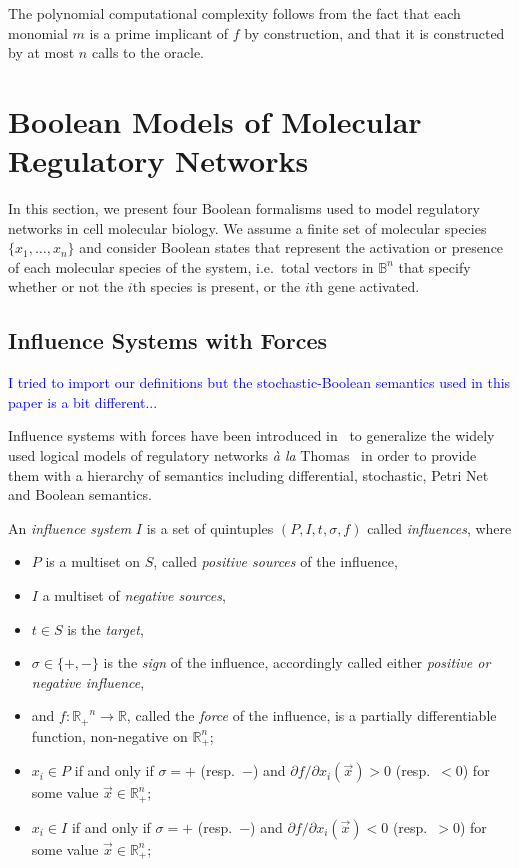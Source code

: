 \documentclass{llncs}
\newcommand{\francois}[1]{\textcolor{blue}{#1}}
\begin{document}
The polynomial computational complexity follows from the fact that each monomial $m$ is a prime implicant
of $f$ by construction, and that it is constructed by at most $n$ calls to the
oracle.




\section{Boolean Models of Molecular Regulatory Networks}

In this section, we present four Boolean formalisms used to model regulatory networks in cell molecular biology.
We assume a finite set of molecular species $\{x_1,\dots,x_n\}$ 
and consider Boolean states that represent the activation or presence of each molecular species of the system, 
i.e.~total vectors in $\mathbb{B}^n$ that specify whether or not the $i$th species is present, or the $i$th gene activated.

\subsection{Influence Systems with Forces}

\francois{I tried to import our definitions but the stochastic-Boolean semantics used in this paper is a bit different...}

Influence systems with forces have been introduced in~\cite{FMRS16cmsb}
to generalize the widely used logical models of regulatory networks \emph{\`a la} Thomas~\cite{Thomas73jtb} 
in order to provide them with a hierarchy of semantics
including differential, stochastic, Petri Net and Boolean semantics.

\begin{definition}\cite{FMRS16cmsb}
An \emph{influence system}
   $I$ is a set of quintuples $(P, I, t, \sigma, f)$ called \emph{influences},
   where 
\begin{itemize}
\item $P$ is a multiset on $S$, called \emph{positive sources} of the influence, 
\item $I$ a multiset of \emph{negative sources}, 
\item $t\in S$ is the \emph{target},
\item $\sigma\in\{+,-\}$ is the \emph{sign} of the influence, accordingly called either \emph{positive or negative influence},
\item and $f:\mathbb{R_+}^n\to\mathbb{R}$, called the \emph{force} of the influence,
is a partially differentiable function, non-negative
   on $\mathbb{R}_+^n$;
\item $x_i\in P$ if and only if $\sigma = +$ (resp.\ $-$) and
   ${\partial {f}}/ {\partial x_i}(\vec x)>0$ (resp.\ $<0$) for some value
   $\vec x\in\mathbb{R}_+^n$;
\item $x_i\in I$ if and only if $\sigma = +$ (resp.\ $-$) and
   ${\partial {f}}/ {\partial x_i}(\vec x)<0$ (resp.\ $>0$) for some value
  $\vec x\in\mathbb{R}_+^n$;
\end{itemize}
\end{definition}
\end{document}
